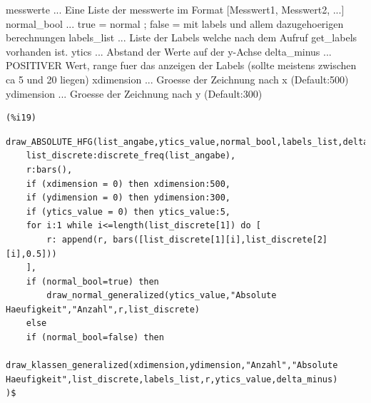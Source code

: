 \documentclass{article}
\begin{document}
messwerte       ... Eine Liste der messwerte im Format [Messwert1, Messwert2, ...]
normal\_bool     ... true = normal ; false = mit labels und allem dazugehoerigen berechnungen
labels\_list     ... Liste der Labels welche nach dem Aufruf get\_labels vorhanden ist.
ytics           ... Abstand der Werte auf der y-Achse
delta\_minus     ... POSITIVER Wert, range fuer das anzeigen der Labels (sollte meistens zwischen ca 5 und 20 liegen)
xdimension      ... Groesse der Zeichnung nach x (Default:500)
ydimension      ... Groesse der Zeichnung nach y (Default:300)

\noindent
\begin{minipage}[t]{8ex}{\color{red}\bf
\begin{verbatim}
(%i19) 
\end{verbatim}}
\end{minipage}
\begin{minipage}[t]{\textwidth}{\color{blue}
\begin{verbatim}
draw_ABSOLUTE_HFG(list_angabe,ytics_value,normal_bool,labels_list,delta_minus,xdimension,ydimension):=block(
    list_discrete:discrete_freq(list_angabe),
    r:bars(),
    if (xdimension = 0) then xdimension:500,
    if (ydimension = 0) then ydimension:300,
    if (ytics_value = 0) then ytics_value:5,
    for i:1 while i<=length(list_discrete[1]) do [
        r: append(r, bars([list_discrete[1][i],list_discrete[2][i],0.5]))
    ],
    if (normal_bool=true) then
        draw_normal_generalized(ytics_value,"Absolute Haeufigkeit","Anzahl",r,list_discrete)
    else
    if (normal_bool=false) then
        draw_klassen_generalized(xdimension,ydimension,"Anzahl","Absolute Haeufigkeit",list_discrete,labels_list,r,ytics_value,delta_minus)
)$
\end{verbatim}}
\end{minipage}
\end{document}
